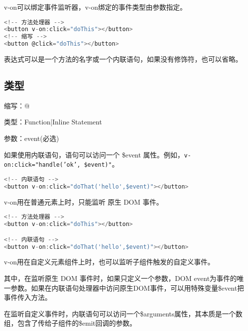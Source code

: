 v-on可以绑定事件监听器，v-on绑定的事件类型由参数指定。




\begin{lstlisting}[language=JavaScript]
<!-- 方法处理器 -->
<button v-on:click="doThis"></button>
<!-- 缩写 -->
<button @click="doThis"></button>
\end{lstlisting}

表达式可以是一个方法的名字或一个内联语句，如果没有修饰符，也可以省略。

\subsection{类型}

\begin{compactitem}
\item 缩写：@
\item 类型：Function|Inline Statement
\item 参数：event(必选)
\end{compactitem}


如果使用内联语句，语句可以访问一个 \$event 属性。例如，\texttt{v-on:click="handle('ok', \$event)"}。

\begin{lstlisting}[language=JavaScript]
<!-- 内联语句 -->
<button v-on:click="doThat('hello',$event)"></button>
\end{lstlisting}

\begin{compactitem}
\item v-on用在普通元素上时，只能监听 原生 DOM 事件。

\begin{lstlisting}[language=JavaScript]
<!-- 方法处理器 -->
<button v-on:click="doThis"></button>

<!-- 内联语句 -->
<button v-on:click="doThat('hello',$event)"></button>
\end{lstlisting}


\item v-on用在自定义元素组件上时，也可以监听子组件触发的自定义事件。
\end{compactitem}

其中，在监听原生 DOM 事件时，如果只定义一个参数，DOM event为事件的唯一参数。如果在内联语句处理器中访问原生DOM事件，可以用特殊变量\$event把事件传入方法。


在监听自定义事件时，内联语句可以访问一个\$arguments属性，其本质是一个数组，包含了传给子组件的\$emit回调的参数。




